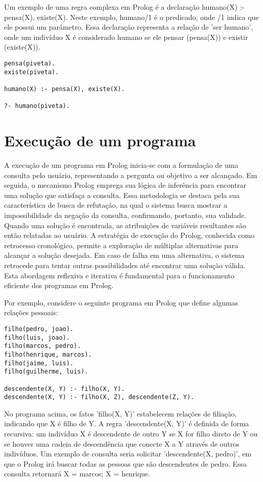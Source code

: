 \documentclass[12pt]{article}
\begin{document}
Um exemplo de uma regra complexa em Prolog é a declaração humano(X) :- pensa(X), existe(X). Neste exemplo, humano/1 é o predicado, onde /1 indica que ele possui um parâmetro. Essa declaração representa a relação de 'ser humano', onde um indivíduo X é considerado humano se ele pensar (pensa(X)) e existir (existe(X)).

\begin{verbatim}
pensa(piveta).
existe(piveta).

humano(X) :- pensa(X), existe(X).

?- humano(piveta).
\end{verbatim}

\section{Execução de um programa}

A execução de um programa em Prolog inicia-se com a formulação de uma consulta pelo usuário, representando a pergunta ou objetivo a ser alcançado. Em seguida, o mecanismo Prolog emprega sua lógica de inferência para encontrar uma solução que satisfaça a consulta. Essa metodologia se destaca pela sua característica de busca de refutação, na qual o sistema busca mostrar a impossibilidade da negação da consulta, confirmando, portanto, sua validade. Quando uma solução é encontrada, as atribuições de variáveis resultantes são então relatadas ao usuário. A estratégia de execução do Prolog, conhecida como retrocesso cronológico, permite a exploração de múltiplas alternativas para alcançar a solução desejada. Em caso de falha em uma alternativa, o sistema retrocede para tentar outras possibilidades até encontrar uma solução válida. Esta abordagem reflexiva e iterativa é fundamental para o funcionamento eficiente dos programas em Prolog.

Por exemplo, considere o seguinte programa em Prolog que define algumas relações pessoais:

\begin{verbatim}
filho(pedro, joao).
filho(luis, joao).
filho(marcos, pedro).
filho(henrique, marcos).
filho(jaime, luis).
filho(guilherme, luis).

descendente(X, Y) :- filho(X, Y).
descendente(X, Y) :- filho(X, Z), descendente(Z, Y).
\end{verbatim}

No programa acima, os fatos 'filho(X, Y)' estabelecem relações de filiação, indicando que X é filho de Y. A regra 'descendente(X, Y)' é definida de forma recursiva: um indivíduo X é descendente de outro Y se X for filho direto de Y ou se houver uma cadeia de descendência que conecte X a Y através de outros indivíduos. Um exemplo de consulta seria  solicitar 'descendente(X, pedro)', em que o Prolog irá buscar todas as pessoas que são descendentes de pedro. Essa consulta retornará X = marcos; X = henrique.
\end{document}
